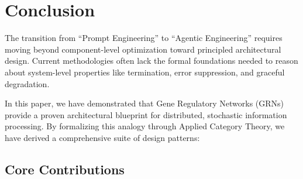 \section{Conclusion}

The transition from ``Prompt Engineering'' to ``Agentic Engineering'' requires moving beyond component-level
optimization toward principled architectural design. Current methodologies often lack the formal foundations
needed to reason about system-level properties like termination, error suppression, and graceful degradation.

In this paper, we have demonstrated that Gene Regulatory Networks (GRNs) provide a proven architectural blueprint
for distributed, stochastic information processing. By formalizing this analogy through Applied Category Theory,
we have derived a comprehensive suite of design patterns:

\subsection*{Core Contributions}


